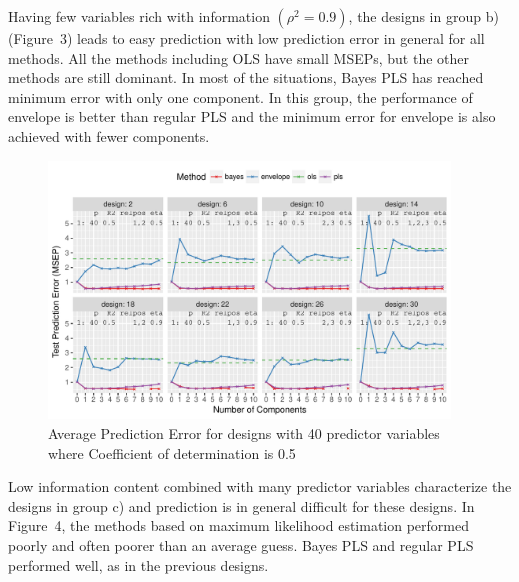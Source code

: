 \documentclass[num-refs]{wiley-article}
\begin{document}
Having few variables rich with information $(\rho^2 = 0.9)$, the designs in group b) (Figure~3) leads to easy prediction with low prediction error in general for all methods. All the methods including OLS have small MSEPs, but the other methods are still dominant. In most of the situations, Bayes PLS has reached minimum error with only one component. In this group, the performance of envelope is better than regular PLS and the minimum error for envelope is also achieved with fewer components.


\begin{figure}[!hptb]
\centering
\includegraphics[width = 0.95\textwidth]{prediction-error-40-1.pdf}
\caption[Prediction Error - 3]{Average Prediction Error for designs with 40 predictor
variables where Coefficient of determination is 0.5}
\label{fig:pred-error-40-1}
\end{figure}

Low information content combined with many predictor variables characterize the designs in group c) and prediction is in general difficult for these designs. In Figure~4, the methods based on maximum likelihood estimation performed poorly and often poorer than an average guess. Bayes PLS and regular PLS performed well, as in the previous designs.

\end{document}
